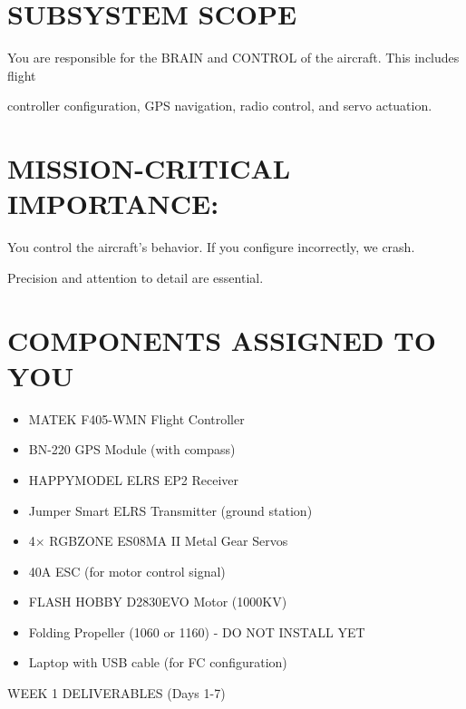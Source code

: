 \documentclass[11pt,letterpaper]{article}
\begin{document}
\section{SUBSYSTEM SCOPE}

You are responsible for the BRAIN and CONTROL of the aircraft. This includes flight\par

controller configuration, GPS navigation, radio control, and servo actuation.\par

\section{MISSION-CRITICAL IMPORTANCE:}

You control the aircraft's behavior. If you configure incorrectly, we crash.\par

Precision and attention to detail are essential.\par

\section{COMPONENTS ASSIGNED TO YOU}

\begin{itemize}
  \item MATEK F405-WMN Flight Controller
  \item BN-220 GPS Module (with compass)
  \item HAPPYMODEL ELRS EP2 Receiver
  \item Jumper Smart ELRS Transmitter (ground station)
  \item 4$\times$ RGBZONE ES08MA II Metal Gear Servos
  \item 40A ESC (for motor control signal)
  \item FLASH HOBBY D2830EVO Motor (1000KV)
  \item Folding Propeller (1060 or 1160) - DO NOT INSTALL YET
  \item Laptop with USB cable (for FC configuration)
\end{itemize}

WEEK 1 DELIVERABLES (Days 1-7)\par
\end{document}
